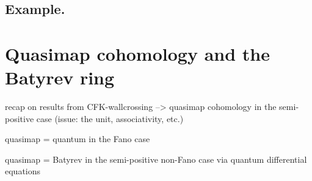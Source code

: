 \documentclass[11pt]{amsart}
\theoremstyle{definition}
\theoremstyle{definition}
\begin{document}
\subsection{Example.}

\section{Quasimap cohomology and the Batyrev ring}

recap on results from CFK-wallcrossing --> quasimap cohomology in the semi-positive case (issue: the unit, associativity, etc.)

quasimap = quantum in the Fano case

quasimap = Batyrev in the semi-positive non-Fano case via quantum differential equations






\bigskip\bigskip


\end{document}
